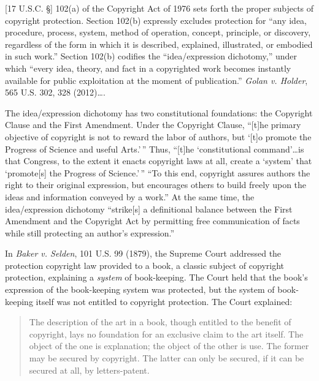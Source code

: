 


[17 U.S.C. \S] 102(a) of the Copyright Act of 1976 sets forth the proper
subjects of copyright protection.
Section 102(b) expressly excludes protection for ``any idea, procedure,
process, system, method of operation, concept, principle, or discovery,
regardless of the form in which it is described, explained, illustrated,
or embodied in such work.'' Section 102(b) codifies
the ``idea/expression dichotomy,'' under which ``every idea, theory, and
fact in a copyrighted work becomes instantly available for public
exploitation at the moment of publication.'' \textit{Golan v. Holder}, 565 U.S.
302, 328 (2012)\ldots.

The idea/expression dichotomy has two constitutional foundations: the
Copyright Clause and the First Amendment. Under the Copyright Clause,
``[t]he primary objective of copyright is not to reward the labor of
authors, but `[t]o promote the Progress of Science and useful Arts.'\,''
Thus, ``[t]he `constitutional
command'\ldots is that Congress, to the extent it enacts copyright laws at
all, create a `system' that `promote[s] the Progress of Science.'\,''
``To this end, copyright assures authors the right to their original
expression, but encourages others to build freely upon the ideas and
information conveyed by a work.''
At the same time, the idea/expression dichotomy ``strike[s] a
definitional balance between the First Amendment and the Copyright Act
by permitting free communication of facts while still protecting an
author's expression.''

In \textit{Baker v. Selden}, 101 U.S. 99 (1879),
the Supreme Court addressed the protection copyright law provided to a
book, a classic subject of copyright protection, explaining a \textit{system} of
book-keeping. The Court held that the book's expression of the book-keeping
system was protected, but the system of book-keeping itself was not entitled to
copyright protection. The Court explained:
\begin{quote}
The description of the art in a book, though entitled to the
benefit of copyright, lays no foundation for an exclusive claim to the
art itself. The object of the one is explanation; the object of the
other is use. The former may be secured by copyright. The latter can
only be secured, if it can be secured at all, by letters-patent.
\end{quote}

